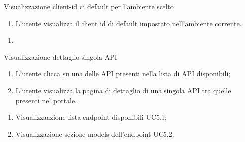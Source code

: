 \begin{usecase}{4.2}{Visualizzazione client-id di default per l'ambiente scelto}\label{uc:visualizzazione-client-id-di-default-per-lambiente-scelto}

    \usecasemain{}
        \begin{enumerate}
            \item L'utente visualizza il client id di default impostato nell'ambiente corrente.
        \end{enumerate}

\end{usecase}


\begin{usecase}{}{}\label{uc:}
    \usecasepre{}
    \usecasedesc{}
    \usecasepost{}

    \usecasemain{}
        \begin{enumerate}
            \item 
        \end{enumerate}

\end{usecase}

\begin{usecase}{5}{Visualizzazione dettaglio singola API}\label{uc:visualizzazione-dettaglio-singola-api}

    \usecasemain{}
        \begin{enumerate}
            \item L'utente clicca su una delle API presenti nella lista di API disponibili;
            \item L'utente visualizza la pagina di dettaglio di una singola API tra quelle presenti nel portale.
        \end{enumerate}

    \usecasegen{}
        \begin{enumerate}
            \item Visualizzaazione lista endpoint disponibili UC5.1;
            \item Visualizzazione sezione models dell'endpoint UC5.2. %
        \end{enumerate}


\end{usecase}


